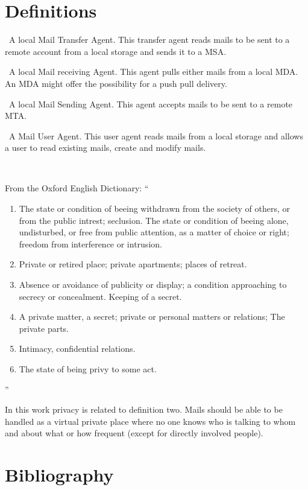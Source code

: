 \documentclass[11pt,a4paper]{book}
\newenvironment{entry}{\par\leavevmode\hangpara{1.5mm}{1}\ignorespaces}{\RaggedRight\par}
\newcommand*{\mainentry}[1]{{\bfseries{#1}}~}
\begin{document}
\backmatter
\begin{appendices}
\chapter{Definitions}
\begin{entry}\mainentry{Local MTA}{A local Mail Transfer Agent. This transfer agent reads mails to be sent to a remote account from a local storage and sends it to a MSA.}\end{entry}
\begin{entry}\mainentry{MRA}{A local Mail receiving Agent. This agent pulls either mails from a local MDA. An MDA might offer the possibility for a push pull delivery.}\end{entry}
\begin{entry}\mainentry{MSA}{A local Mail Sending Agent. This agent accepts mails to be sent to a remote MTA. }\end{entry}
\begin{entry}\mainentry{MUA}{A Mail User Agent. This user agent reads mails from a local storage and allows a user to read existing mails, create and modify mails.}\end{entry}
\begin{entry}\mainentry{Privacy}{From the Oxford English Dictionary: ``
  \begin{enumerate}
    \item The state or condition of beeing withdrawn from the society of others, or from the public intrest; seclusion. The state or condition of beeing alone, undisturbed, or free from public attention, as a matter of choice or right; freedom from interference or intrusion.
    \item Private or retired place; private apartments; places of retreat.
    \item Absence or avoidance of publicity or display; a condition approaching to secrecy or concealment. Keeping of a secret.
    \item A private matter, a secret; private or personal matters or relations; The private parts.
    \item Intimacy, confidential relations.
    \item The state of being privy to some act.
  \end{enumerate}''\cite[FIXME]{OXFORD}\par
  
  In this work privacy is related to definition two. Mails should be able to be handled as a virtual private place where no one knows who is talking to whom and about what or how frequent (except for directly involved people).
}\end{entry}


\chapter{Bibliography}
\printbibliography[title={},heading=none]
\begin{comment}

\end{comment}
\end{appendices}
\end{document}

